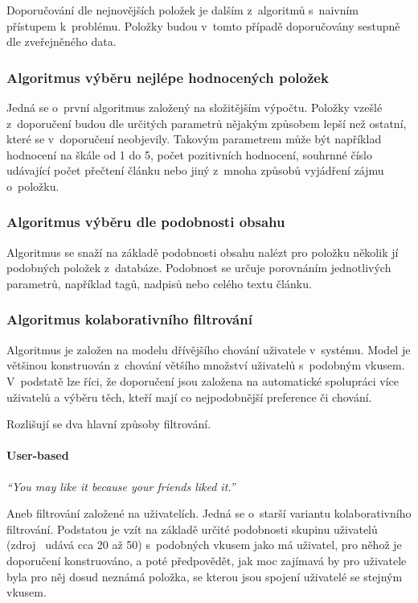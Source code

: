 \documentclass[thesis=M,czech]{FITthesis}[2014/05/07]
\begin{document}
Doporučování dle nejnovějších položek je dalším z~algoritmů s~naivním přístupem k~problému. Položky budou v~tomto případě doporučovány sestupně dle zveřejněného data. 

\subsubsection{Algoritmus výběru nejlépe hodnocených položek}

Jedná se o~první algoritmus založený na složitějším výpočtu. Položky vzešlé z~doporučení budou dle určitých parametrů nějakým způsobem lepší než ostatní, které se v~doporučení neobjevily. Takovým parametrem může být například hodnocení na škále od 1 do 5, počet pozitivních hodnocení, souhrnné číslo udávající počet přečtení článku nebo jiný z~mnoha způsobů vyjádření zájmu o~položku. 

\subsubsection{Algoritmus výběru dle podobnosti obsahu}

Algoritmus se snaží na základě podobnosti obsahu nalézt pro položku několik jí podobných položek z~databáze. Podobnost se určuje porovnáním jednotlivých parametrů, například tagů, nadpisů nebo celého textu článku.

\subsubsection{Algoritmus kolaborativního filtrování}

Algoritmus je založen na modelu dřívějšího chování uživatele v~systému. Model je většinou konstruován z~chování většího množství uživatelů s~podobným vkusem. V~podstatě lze říci, že doporučení jsou založena na automatické spolupráci více uživatelů a výběru těch, kteří mají co nejpodobnější preference či chování.

Rozlišují se dva hlavní způsoby filtrování.

\paragraph{User-based}

\emph{``You may like it because your friends liked it.''}~\cite{cf}

Aneb filtrování založené na uživatelích. Jedná se o~starší variantu kolaborativního filtrování. Podstatou je vzít na základě určité podobnosti skupinu uživatelů (zdroj~\cite{cf} udává cca 20 až 50) s~podobných vkusem jako má uživatel, pro něhož je doporučení konstruováno, a poté předpovědět, jak moc zajímavá by pro uživatele byla pro něj dosud neznámá položka, se kterou jsou spojení uživatelé se stejným vkusem.
\end{document}
